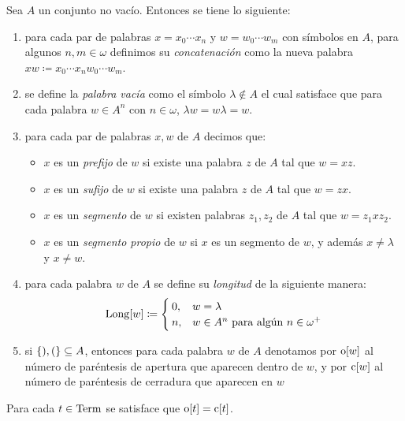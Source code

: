\begin{definition}
	Sea $A$ un conjunto no vacío. Entonces se tiene lo siguiente:
	\begin{enumerate}
		\item para cada par de palabras $x = x_{0}\cdots x_{n}$  y $w = w_{0}\cdots w_{m}$ con símbolos en $A$, para algunos $n, m\in\omega$ definimos su \emph{concatenación} como la nueva palabra $xw\coloneq x_{0}\cdots x_{n} w_{0}\cdots w_{m}$.
		\item se define la \emph{palabra vacía} como el símbolo $\lambda\notin A$ el cual satisface que para cada palabra $w\in A^{n}$ con $n\in\omega$, $\lambda w = w\lambda = w$.
		\item para cada par de palabras $x, w$ de $A$ decimos que:
		\begin{itemize}
			\item $x$ es un \emph{prefijo} de $w$ si existe una palabra $z$ de $A$ tal que $w = xz$.
			\item $x$ es un \emph{sufijo} de $w$ si existe una palabra $z$ de $A$ tal que $w = zx$.
			\item $x$ es un \emph{segmento} de $w$ si existen palabras $z_{1}, z_{2}$ de $A$ tal que $w = z_{1}xz_{2}$.
			\item $x$ es un \emph{segmento propio} de $w$ si $x$ es un segmento de $w$, y además $x\neq\lambda$ y $x\neq w$.
		\end{itemize}
		\item para cada palabra $w$ de $A$ se define su \emph{longitud} de la siguiente manera:
		\[
			\LONGITUD\bra*{w}\coloneqq
			\begin{cases}
				0, & w =\lambda\\
				n, & w\in A^{n}\text{ para algún $n\in\omega^{+}$}
			\end{cases}
		\]
		\item si $\set*{), (}\subseteq A$, entonces para cada palabra $w$ de $A$ denotamos por $\ABIERTO\bra*{w}$ al número de paréntesis de apertura que aparecen dentro de $w$, y por $\CERRADO\bra*{w}$ al número de paréntesis de cerradura que aparecen en $w$
	\end{enumerate}
\end{definition}

\begin{theorem}
	\label{theo: parentesis_balanceados_terminos}
	Para cada $t\in\TERMINOS$ se satisface que $\ABIERTO\bra*{t} =\CERRADO\bra*{t}$.
\end{theorem}

